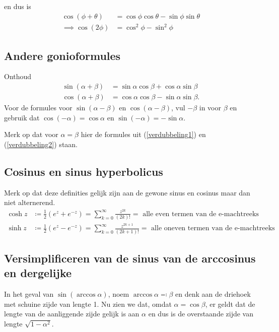 en dus is
\begin{align*}
    \cos (\phi + \theta) &= \cos \phi \cos \theta - \sin \phi \sin \theta \\
    \implies \cos (2 \phi) &= \cos^2 \phi - \sin^2 \phi
\end{align*}

\subsection{Andere gonioformules}

Onthoud
\begin{align*}
    \sin(\alpha + \beta) &= \sin \alpha \cos \beta + \cos \alpha \sin \beta \\
    \cos(\alpha + \beta) &= \cos \alpha \cos \beta - \sin \alpha \sin \beta .
\end{align*}
Voor de formules voor $\sin(\alpha - \beta)$ en $\cos(\alpha - \beta)$, vul $-\beta$ in voor $\beta$ en gebruik dat $\cos (-\alpha) = \cos \alpha $ en $\sin (-\alpha) = - \sin \alpha $.

Merk op dat voor $\alpha = \beta$ hier de formules uit (\ref{verdubbeling1}) en (\ref{verdubbeling2}) staan.



\subsection{Cosinus en sinus hyperbolicus}\label{subsec:cosinusEnSinusHyperbolicus}

Merk op dat deze definities gelijk zijn aan de gewone sinus en cosinus maar dan niet alternerend.
\begin{align*}
    \cosh z &\coloneqq \frac{1}{2} (e^z + e^{-z}) = \sum_{k=0}^\infty \frac{z^{2k}}{(2k)!} = \text{ alle even termen van de e-machtreeks} \\
    \sinh z &\coloneqq \frac{1}{2} (e^z - e^{-z}) = \sum_{k=0}^\infty \frac{z^{2k+1}}{(2k+1)!} = \text{ alle oneven termen van de e-machtreeks}
\end{align*}

\subsection{Versimplificeren van de sinus van de arccosinus en dergelijke}\label{subsec:versimplificerenVanDeSinusVanDeArccosinusEnDergelijke}

In het geval van $\sin (\arccos \alpha)$, noem $\arccos \alpha \eqqcolon \beta$ en denk aan de driehoek met schuine zijde van lengte 1.
Nu zien we dat, omdat $\alpha = \cos \beta$, er geldt dat de lengte van de aanliggende zijde gelijk is aan $\alpha$ en dus is de overstaande zijde van lengte $\sqrt{1-\alpha^2}$.

